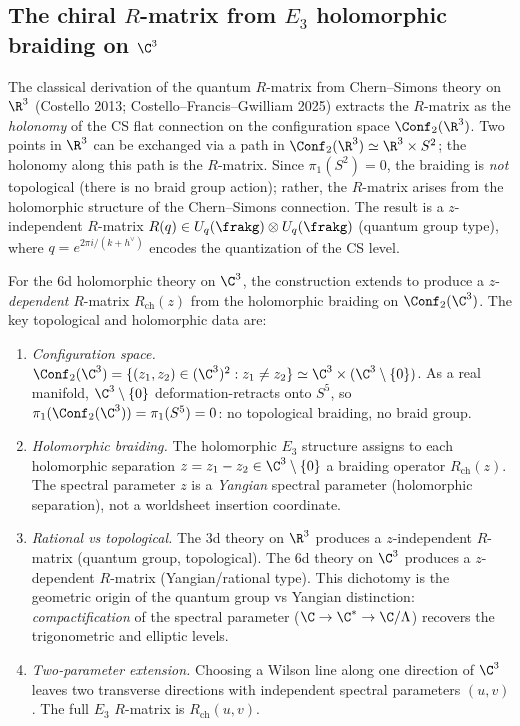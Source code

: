 \subsection{The chiral \texorpdfstring{$R$}{R}-matrix from \texorpdfstring{$E_3$}{E-3} holomorphic braiding on \texorpdfstring{$\C^3$}{C-3}}
\label{subsec:chiral-rmatrix-e3-braiding}

The classical derivation of the quantum $R$-matrix from Chern--Simons theory on $\R^3$ (Costello 2013; Costello--Francis--Gwilliam 2025) extracts the $R$-matrix as the \emph{holonomy} of the CS flat connection on the configuration space $\Conf_2(\R^3)$. Two points in $\R^3$ can be exchanged via a path in $\Conf_2(\R^3) \simeq \R^3 \times S^2$; the holonomy along this path is the $R$-matrix. Since $\pi_1(S^2) = 0$, the braiding is \emph{not} topological (there is no braid group action); rather, the $R$-matrix arises from the holomorphic structure of the Chern--Simons connection. The result is a $z$-independent $R$-matrix $R(q) \in U_q(\frakg) \otimes U_q(\frakg)$ (quantum group type), where $q = e^{2\pi i/(k + h^\vee)}$ encodes the quantization of the CS level.

For the 6d holomorphic theory on $\C^3$, the construction extends to produce a $z$-\emph{dependent} $R$-matrix $R_{\mathrm{ch}}(z)$ from the holomorphic braiding on $\Conf_2(\C^3)$. The key topological and holomorphic data are:

\begin{enumerate}[label=\textup{(\roman*)}]
 \item \emph{Configuration space.} $\Conf_2(\C^3) = \{(z_1, z_2) \in (\C^3)^2 : z_1 \neq z_2\} \simeq \C^3 \times (\C^3 \setminus \{0\})$. As a real manifold, $\C^3 \setminus \{0\}$ deformation-retracts onto $S^5$, so $\pi_1(\Conf_2(\C^3)) = \pi_1(S^5) = 0$: no topological braiding, no braid group.

 \item \emph{Holomorphic braiding.} The holomorphic $E_3$ structure assigns to each holomorphic separation $z = z_1 - z_2 \in \C^3 \setminus \{0\}$ a braiding operator $R_{\mathrm{ch}}(z)$. The spectral parameter $z$ is a \emph{Yangian} spectral parameter (holomorphic separation), not a worldsheet insertion coordinate.

 \item \emph{Rational vs topological.} The 3d theory on $\R^3$ produces a $z$-independent $R$-matrix (quantum group, topological). The 6d theory on $\C^3$ produces a $z$-dependent $R$-matrix (Yangian/rational type). This dichotomy is the geometric origin of the quantum group vs Yangian distinction: \emph{compactification} of the spectral parameter ($\C \to \C^* \to \C/\Lambda$) recovers the trigonometric and elliptic levels.

 \item \emph{Two-parameter extension.} Choosing a Wilson line along one direction of $\C^3$ leaves two transverse directions with independent spectral parameters $(u, v)$. The full $E_3$ $R$-matrix is $R_{\mathrm{ch}}(u, v)$.
\end{enumerate}

